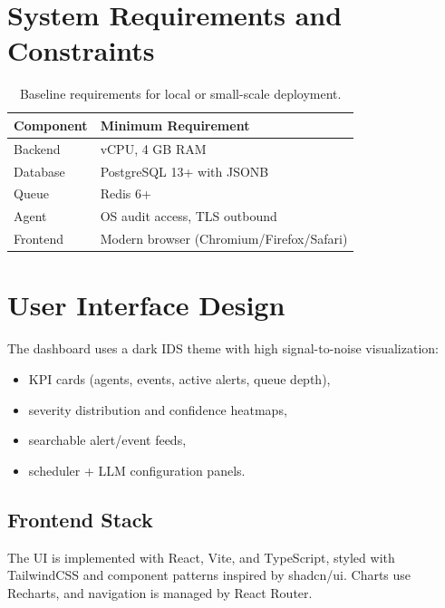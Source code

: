 \documentclass[conference]{IEEEtran}
\begin{document}
\section{System Requirements and Constraints}
\begin{table}[!t]
\centering
\begin{tabular}{>{\raggedright\arraybackslash}p{} >{\raggedright\arraybackslash}p{}}
\toprule
\textbf{Component} & \textbf{Minimum Requirement} \\
\midrule
Backend & 2 vCPU, 4 GB RAM \\
Database & PostgreSQL 13+ with JSONB \\
Queue & Redis 6+ \\
Agent & OS audit access, TLS outbound \\
Frontend & Modern browser (Chromium/Firefox/Safari) \\
\bottomrule
\end{tabular}
\caption{Baseline requirements for local or small-scale deployment.}
\label{tab:reqs}
\end{table}

\section{User Interface Design}
The dashboard uses a dark IDS theme with high signal-to-noise visualization:
\begin{itemize}[leftmargin=1.2em]
    \item KPI cards (agents, events, active alerts, queue depth),
    \item severity distribution and confidence heatmaps,
    \item searchable alert/event feeds,
    \item scheduler + LLM configuration panels.
\end{itemize}

\subsection{Frontend Stack}
The UI is implemented with React, Vite, and TypeScript, styled with TailwindCSS and component patterns inspired by shadcn/ui. Charts use Recharts, and navigation is managed by React Router.
\end{document}
